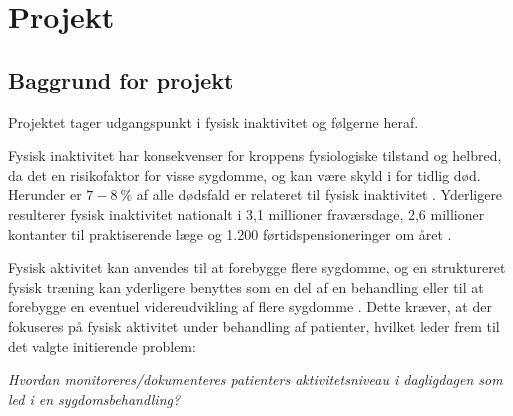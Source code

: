 \chapter{Projekt}
\section{Baggrund for projekt}
Projektet tager udgangspunkt i fysisk inaktivitet og følgerne heraf. 

Fysisk inaktivitet har konsekvenser for kroppens fysiologiske tilstand og helbred, da det en risikofaktor for visse sygdomme, og kan være skyld i for tidlig død. Herunder er $7-8~\%$ af alle dødsfald er relateret til fysisk inaktivitet \citep{aagaard2014,motionsraad2007}.  
Yderligere resulterer fysisk inaktivitet nationalt i 3,1 millioner fraværsdage, 2,6 millioner kontanter til praktiserende læge og 1.200 førtidspensioneringer om året \citep{christensen2012}. 

Fysisk aktivitet kan anvendes til at forebygge flere sygdomme, og en struktureret fysisk træning kan yderligere benyttes som en del af en behandling eller til at forebygge en eventuel videreudvikling af flere sygdomme \citep{motionsraad2007}. Dette kræver, at der fokuseres på fysisk aktivitet under behandling af patienter, hvilket leder frem til det valgte initierende problem:

\noindent
\begin{center}
\textit{Hvordan monitoreres/dokumenteres patienters aktivitetsniveau i dagligdagen som led i en sygdomsbehandling?}  
\end{center}
